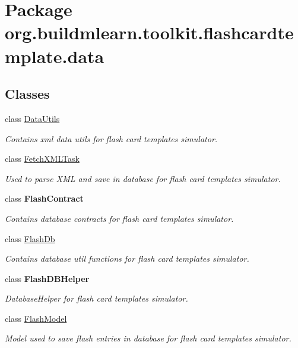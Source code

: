\hypertarget{namespaceorg_1_1buildmlearn_1_1toolkit_1_1flashcardtemplate_1_1data}{}\section{Package org.\+buildmlearn.\+toolkit.\+flashcardtemplate.\+data}
\label{namespaceorg_1_1buildmlearn_1_1toolkit_1_1flashcardtemplate_1_1data}
\subsection*{Classes}
\begin{DoxyCompactItemize}
\item 
class \hyperlink{classorg_1_1buildmlearn_1_1toolkit_1_1flashcardtemplate_1_1data_1_1DataUtils}{Data\+Utils}
\begin{DoxyCompactList}\small\item\em Contains xml data utils for flash card template\textquotesingle{}s simulator. \end{DoxyCompactList}\item 
class \hyperlink{classorg_1_1buildmlearn_1_1toolkit_1_1flashcardtemplate_1_1data_1_1FetchXMLTask}{Fetch\+X\+M\+L\+Task}
\begin{DoxyCompactList}\small\item\em Used to parse X\+ML and save in database for flash card template\textquotesingle{}s simulator. \end{DoxyCompactList}\item 
class {\bfseries Flash\+Contract}
\begin{DoxyCompactList}\small\item\em Contains database contracts for flash card template\textquotesingle{}s simulator. \end{DoxyCompactList}\item 
class \hyperlink{classorg_1_1buildmlearn_1_1toolkit_1_1flashcardtemplate_1_1data_1_1FlashDb}{Flash\+Db}
\begin{DoxyCompactList}\small\item\em Contains database util functions for flash card template\textquotesingle{}s simulator. \end{DoxyCompactList}\item 
class {\bfseries Flash\+D\+B\+Helper}
\begin{DoxyCompactList}\small\item\em Database\+Helper for flash card template\textquotesingle{}s simulator. \end{DoxyCompactList}\item 
class \hyperlink{classorg_1_1buildmlearn_1_1toolkit_1_1flashcardtemplate_1_1data_1_1FlashModel}{Flash\+Model}
\begin{DoxyCompactList}\small\item\em Model used to save flash entries in database for flash card template\textquotesingle{}s simulator. \end{DoxyCompactList}\end{DoxyCompactItemize}
